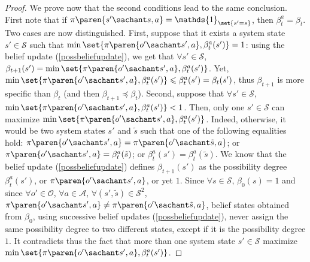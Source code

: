 \begin{proof}
We prove now that the second conditions
lead to the same conclusion. 
First note that if $\pi \paren{s'\sachant s,a} = \mathds{1}_{\set{s'=s}}$, 
then $\beta^a_t = \beta_t$.
Two cases are now distinguished.
First, suppose that it exists a system state $s' \in \mathcal{S}$ such that 
$\min \set{ \pi \paren{ o' \sachant s',a}, \beta^a_t(s') }=1$:
using the belief update (\ref{possbeliefupdate}), 
we get that
$\forall s' \in \mathcal{S}$,
$\beta_{t+1}(s') = \min \set{ \pi \paren{ o' \sachant s',a}, \beta^a_t(s') }$.
Yet, %
$\min \set{ \pi \paren{ o' \sachant s',a}, \beta^a_t(s')} \leqslant \beta^a_t(s')
= \beta_t(s')$, thus $\beta_{t+1}$ is more specific than $\beta_t$ 
(and then $\beta_{t+1} \preceq \beta_t$).
Second, suppose that $\forall s' \in \mathcal{S}$, 
$\min \set{ \pi \paren{ o' \sachant s', a}, \beta^a_t(s') }<1$.
Then, only one $s' \in \mathcal{S}$ 
can maximize $\min \set{ \pi \paren{o' \sachant s',a}, \beta^a_t(s') }$.
Indeed, otherwise, 
it would be two system states 
$s'$ and $\tilde{s}$ such that
one of the following equalities hold:
$\pi \paren{o' \sachant  s', a} = \pi \paren{ o' \sachant \tilde{s}, a}$;
or $\pi \paren{o' \sachant s',a} = \beta^a_t(\tilde{s})$;
or $\beta^a_t(s') = \beta^a_t(\tilde{s})$.
We know that the belief update (\ref{possbeliefupdate})
defines $\beta_{t+1}(s')$
as the possibility degree $\beta^a_t(s')$, 
or $\pi \paren{o' \sachant s',a}$, or yet $1$.
Since $\forall s \in \mathcal{S}$, $\beta_0(s)=1$
and
since $\forall o' \in \mathcal{O}$, 
$\forall a \in \mathcal{A}$,
$\forall (s', \tilde{s}) \in \mathcal{S}^2$,
$\pi \paren{o' \sachant s',a} \neq \pi \paren{o' \sachant \tilde{s},a}$,
belief states obtained from $\beta_0$,
using successive belief updates (\ref{possbeliefupdate}), 
never assign the same possibility degree to
two different states, 
except if it is the possibility degree $1$. 
It contradicts thus the fact that more than one system state 
$s' \in \mathcal{S}$ 
maximize $\min \set{ \pi \paren{o' \sachant s',a}, \beta^a_t(s') }$.

\end{proof}
